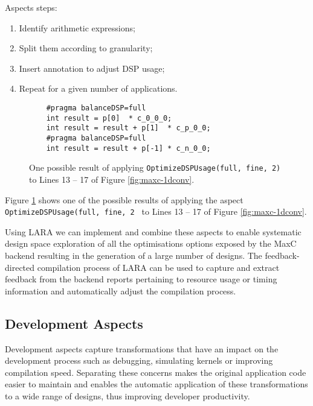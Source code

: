 Aspects steps:

\begin{enumerate}
\item Identify arithmetic expressions;
\item Split them according to granularity;
\item Insert annotation to adjust DSP usage;
\item Repeat for a given number of applications.
\end{enumerate}

\newsavebox{\secondlisting}
\begin{lrbox}{\secondlisting}%
  
\end{lrbox}

\begin{figure}
  \begin{lstlisting}
    #pragma balanceDSP=full
    int result = p[0]  * c_0_0_0;
    int result = result + p[1]  * c_p_0_0;
    #pragma balanceDSP=full
    int result = result + p[-1] * c_n_0_0;
  \end{lstlisting}
  \caption{One possible result of applying
    \texttt{OptimizeDSPUsage(full, fine, 2)} to Lines 13 -- 17 of Figure
    \ref{fig:maxc-1dconv}.}
  \label{fig:maxc-1dconv-aspect}
\end{figure}

Figure \ref{fig:maxc-1dconv-aspect} shows one of the possible results
of applying the aspect \texttt{OptimizeDSPUsage(full, fine, 2 } to
Lines 13 -- 17 of Figure \ref{fig:maxc-1dconv}.

Using LARA we can implement and combine these aspects to enable
systematic design space exploration of all the optimisations options
exposed by the MaxC backend resulting in the generation of a large
number of designs. The feedback-directed compilation process of LARA can
be used to capture and extract feedback from the backend reports
pertaining to resource usage or timing information and automatically
adjust the compilation process.

\subsection{Development Aspects}

Development aspects capture transformations that have an impact on the
development process such as debugging, simulating kernels or improving
compilation speed. Separating these concerns makes the original
application code easier to maintain and enables the automatic
application of these transformations to a wide range of designs, thus
improving developer productivity.

